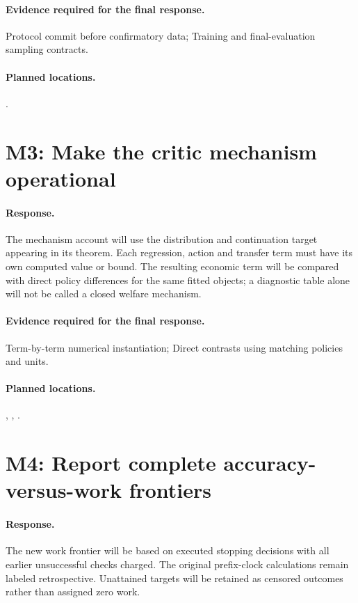 \paragraph*{Evidence required for the final response.} Protocol commit before confirmatory data; Training and final-evaluation sampling contracts.
\paragraph*{Planned locations.} .

\section*{M3: Make the critic mechanism operational}
\paragraph*{Response.} The mechanism account will use the distribution and continuation target appearing in its theorem. Each regression, action and transfer term must have its own computed value or bound. The resulting economic term will be compared with direct policy differences for the same fitted objects; a diagnostic table alone will not be called a closed welfare mechanism.
\paragraph*{Evidence required for the final response.} Term-by-term numerical instantiation; Direct contrasts using matching policies and units.
\paragraph*{Planned locations.} , , .

\section*{M4: Report complete accuracy-versus-work frontiers}
\paragraph*{Response.} The new work frontier will be based on executed stopping decisions with all earlier unsuccessful checks charged. The original prefix-clock calculations remain labeled retrospective. Unattained targets will be retained as censored outcomes rather than assigned zero work.
